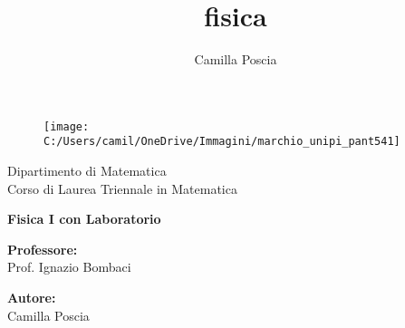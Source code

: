 \documentclass[italian,11pt,a4paper]{article}
\title{fisica}
\author{Camilla Poscia}
\begin{document}
\begin{titlepage} 
\begin{figure}
	\centering
	\texttt{[image: C:/Users/camil/OneDrive/Immagini/marchio\_unipi\_pant541]}
	\label{fig:marchiounipipant541}
\end{figure}

	\vspace{20mm}
	
	\begin{Large}
		\begin{center}
			Dipartimento di Matematica\\ Corso di Laurea Triennale in Matematica\\
			\vspace{30mm}
		
			{\huge{\bf Fisica I con Laboratorio}}\\
		\end{center}
	\end{Large}
	
	\vspace{7,5 cm}

	\begin{minipage}[t]{0.47\textwidth}
		{\large{\bf Professore:}\\ \large{Prof. Ignazio Bombaci}}
	\end{minipage}
	\hfill
	\begin{minipage}[t]{0.47\textwidth}\raggedleft
		{\large{\bf Autore:}\\ \large{Camilla Poscia}}
	\end{minipage}
	
	\vspace{25mm}
	
	\hrulefill
	
	\vspace{5mm}
	
	
\end{titlepage}
\end{document}
